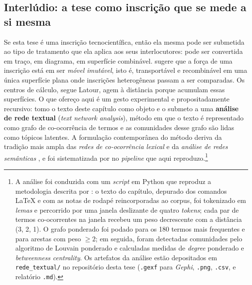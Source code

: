 %

\subsection*{Interlúdio: a tese como inscrição que se mede a si mesma}

Se esta tese é uma inscrição tecnocientífica, então ela mesma pode ser
submetida ao tipo de tratamento que ela aplica aos seus interlocutores:
pode ser convertida em traço, em diagrama, em superfície combinável.
\textcite{Latour1986Visualization} sugere que a força de uma inscrição
está em ser \textit{móvel imutável}, isto é, transportável e
recombinável em uma única superfície plana onde inscrições heterogêneas
passam a ser comparadas. Os centros de cálculo, segue Latour, agem à
distância porque acumulam essas superfícies. O que ofereço aqui é um
gesto experimental e propositadamente recursivo: tomo o texto deste
capítulo como objeto e o submeto a uma \textbf{análise de rede textual}
(\textit{text network analysis}), método em que o texto é representado
como grafo de co-ocorrência de termos e as comunidades desse grafo são
lidas como tópicos latentes. A formulação contemporânea do método
deriva da tradição mais ampla das \textit{redes de co-ocorrência
lexical} \parencite{ferrercancho2001small} e da \textit{análise de
redes semânticas} \parencite{diesner2005revealing}, e foi sistematizada
por \textcite{paranyushkin2019infranodus} no \textit{pipeline} que aqui
reproduzo.\footnote{A análise foi conduzida com um \textit{script} em
Python que reproduz a metodologia descrita por
\textcite{paranyushkin2019infranodus}: o texto do capítulo, depurado
dos comandos \LaTeX{} e com as notas de rodapé reincorporadas ao
corpus, foi tokenizado em \textit{lemas} e percorrido por uma janela
deslizante de quatro \textit{tokens}; cada par de termos co-ocorrentes
na janela recebeu um peso decrescente com a distância (3, 2, 1). O
grafo ponderado foi podado para os 180 termos mais frequentes e para
arestas com peso $\geq 2$; em seguida, foram detectadas comunidades
pelo algoritmo de Louvain ponderado \parencite{blondel2008fast} e
calculadas medidas de \textit{degree} ponderado e \textit{betweenness
centrality}. Os artefatos da análise estão depositados em
\texttt{rede_textual/} no repositório desta tese (\texttt{.gexf} para
\textit{Gephi}, \texttt{.png}, \texttt{.csv}, e relatório
\texttt{.md}).}

